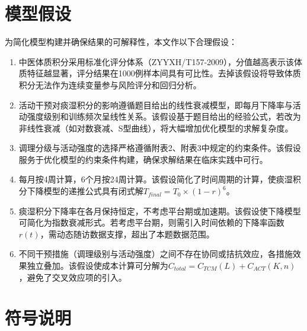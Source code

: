 \documentclass[12pt,a4paper]{ctexart}
\begin{document}
\section{模型假设}

为简化模型构建并确保结果的可解释性，本文作以下合理假设：

\begin{enumerate}[label=\textbf{假设\arabic*.}]
    \item 中医体质积分采用标准化评分体系（ZYYXH/T157-2009），分值越高表示该体质特征越显著，评分结果在1000例样本间具有可比性。去掉该假设将导致体质积分无法作为连续变量参与风险评分和回归分析。

    \item 活动干预对痰湿积分的影响遵循题目给出的线性衰减模型，即每月下降率与活动强度级别和训练频次呈线性关系。该假设基于题目给出的经验公式，若改为非线性衰减（如对数衰减、S型曲线），将大幅增加优化模型的求解复杂度。

    \item 调理分级与活动强度的选择严格遵循附表2、附表3中规定的约束条件。该假设服务于优化模型的约束条件构建，确保求解结果在临床实践中可行。

    \item 每月按4周计算，6个月按24周计算。该假设简化了时间周期的计算，使痰湿积分下降模型的递推公式具有闭式解$T_{final} = T_0 \times (1-r)^6$。

    \item 痰湿积分下降率在各月保持恒定，不考虑平台期或加速期。该假设使下降模型可简化为指数衰减形式。若考虑平台期，则需引入时间依赖的下降率函数$r(t)$，需动态随访数据支撑，超出了本题数据范围。

    \item 不同干预措施（调理级别与活动强度）之间不存在协同或拮抗效应，各措施效果独立叠加。该假设使成本计算可分解为$C_{total} = C_{TCM}(L) + C_{ACT}(K,n)$，避免了交叉效应项的引入。
\end{enumerate}

\section{符号说明}
\end{document}
